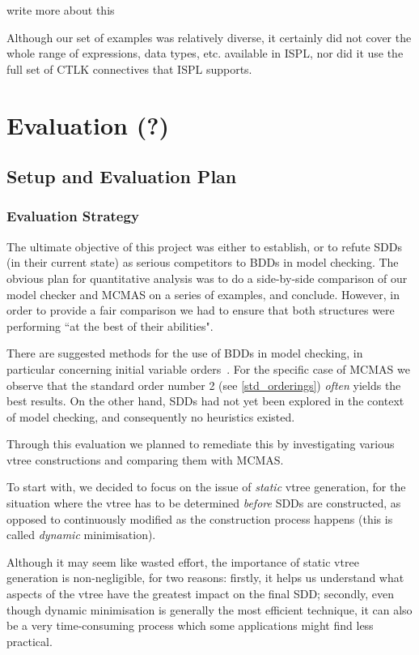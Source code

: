 \documentclass[11pt]{article}
\begin{document}
write more about this

Although our set of examples was relatively diverse, it certainly did not cover the whole range of expressions, data types, etc. available in ISPL, nor did it use the full set of CTLK connectives that ISPL supports.



\section{Evaluation (?)} 


\subsection{Setup and Evaluation Plan}

\subsubsection{Evaluation Strategy}

The ultimate objective of this project was either to establish, or to refute SDDs (in their current state) as serious competitors to BDDs in model checking. The obvious plan for quantitative analysis was to do a side-by-side comparison of our model checker and MCMAS on a series of examples, and conclude. However, in order to provide a fair comparison we had to ensure that both structures were performing ``at the best of their abilities". 

There are suggested methods for the use of BDDs in model checking, in particular concerning initial variable orders~\cite{bdd_heuristics}. For the specific case of MCMAS we observe that the standard order number 2 (see \ref{std_orderings}) \textit{often} yields the best results.
On the other hand, SDDs had not yet been explored in the context of model checking, and consequently no heuristics existed. 

Through this evaluation we planned to remediate this by investigating various vtree constructions and comparing them with MCMAS. 

To start with, we decided to focus on the issue of \textit{static} vtree generation, for the situation where the vtree has to be determined \textit{before} SDDs are constructed, as opposed to continuously modified as the construction process happens (this is called \textit{dynamic} minimisation). 

Although it may seem like wasted effort, the importance of static vtree generation is non-negligible, for two reasons: firstly, it helps us understand what aspects of the vtree have the greatest impact on the final SDD; secondly, even though dynamic minimisation is generally the most efficient technique, it can also be a very time-consuming process which some applications might find less practical. 
\end{document}
